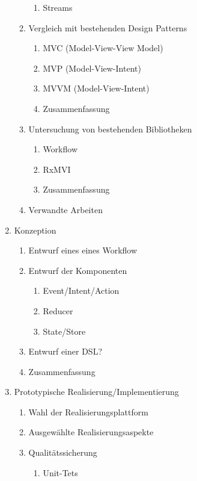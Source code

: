 \begin{enumerate}
\begin{enumerate}
\begin{enumerate}
            \item Streams
        \end{enumerate}
        \item Vergleich mit bestehenden Design Patterns
        \begin{enumerate}
            \item MVC (Model-View-View Model)
            \item MVP (Model-View-Intent)
            \item MVVM (Model-View-Intent)
            \item Zusammenfassung
        \end{enumerate}
        \item Untersuchung von bestehenden Bibliotheken
        \begin{enumerate}
            \item Workflow
            \item RxMVI
            \item Zusammenfassung
        \end{enumerate}
        \item Verwandte Arbeiten
    \end{enumerate}
    \item Konzeption
    \begin{enumerate}
        \item Entwurf eines eines Workflow
        \item Entwurf der Komponenten
        \begin{enumerate}
            \item Event/Intent/Action
            \item Reducer
            \item State/Store
        \end{enumerate}
        \item Entwurf einer DSL?
        \item Zusammenfassung
    \end{enumerate}
    \item Prototypische Realisierung/Implementierung
        \begin{enumerate}
            \item Wahl der Realisierungsplattform
            \item Ausgewählte Realisierungsaspekte
            \item Qualitätssicherung
            \begin{enumerate}
                \item Unit-Tets

\end{enumerate}
\end{enumerate}
\end{enumerate}
